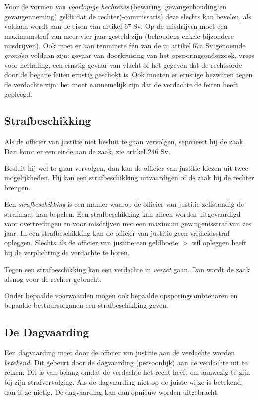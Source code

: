 \documentclass{article}
\begin{document}
Voor de vormen van \emph{voorlopige hechtenis} (bewaring, gevangenhouding en
gevangenneming) geldt dat de rechter(-commissaris) deze slechts kan bevelen,
als voldaan wordt aan de eisen van artikel 67 Sv. Op de misdrijven moet een
maximumstraf van meer vier jaar gesteld zijn (behoudens enkele bijzondere
misdrijven). Ook moet er aan tenminste \'e\'en van de in artikel 67a Sv
genoemde \emph{gronden} voldaan zijn: gevaar van doorkruising van het
opsporingsonderzoek, vrees voor herhaling, een ernstig gevaar van vlucht of het
gegeven dat de rechtsorde door de begane feiten ernstig geschokt is. Ook moeten
er ernstige bezwaren tegen de verdachte zijn: het moet aannemelijk zijn dat de
verdachte de feiten heeft gepleegd.

\subsection{Strafbeschikking}

Als de officier van justitie niet besluit te gaan vervolgen, seponeert hij de
zaak. Dan komt er een einde aan de zaak, zie artikel 246 Sv.

Besluit hij wel te gaan vervolgen, dan kan de officier van justitie kiezen uit
twee mogelijkheden. Hij kan een strafbeschikking uitvaardigen of de zaak bij de
rechter brengen.

Een \emph{strafbeschikking} is een manier waarop de officier van justitie
zelfstandig de strafmaat kan bepalen. Een strafbeschikking kan alleen worden
uitgevaardigd voor overtredingen en voor misdrijven met een maximum
gevangenisstraf van zes jaar. In een strafbeschikking kan de officier van
justitie geen vrijheidsstraf opleggen. Slechts als de officier van justitie een
geldboete $>$  wil opleggen heeft hij de verplichting de verdachte te
horen.

Tegen een strafbeschikking kan een verdachte in \emph{verzet} gaan. Dan wordt
de zaak alsnog voor de rechter gebracht.

Onder bepaalde voorwaarden mogen ook bepaalde opsporingsambtenaren en bepaalde
bestuursorganen een strafbeschikking geven.

\subsection{De Dagvaarding}

Een dagvaarding moet door de officier van justitie aan de verdachte worden
\emph{betekend}. Dit gebeurt door de dagvaarding (persoonlijk) aan de verdachte
uit te reiken. Dit is van belang omdat de verdachte het recht heeft om aanwezig
te zijn bij zijn strafvervolging. Als de dagvaarding niet op de juiste wijze is
betekend, dan is ze nietig. De dagvaarding kan dan opnieuw worden uitgebracht.
\end{document}
